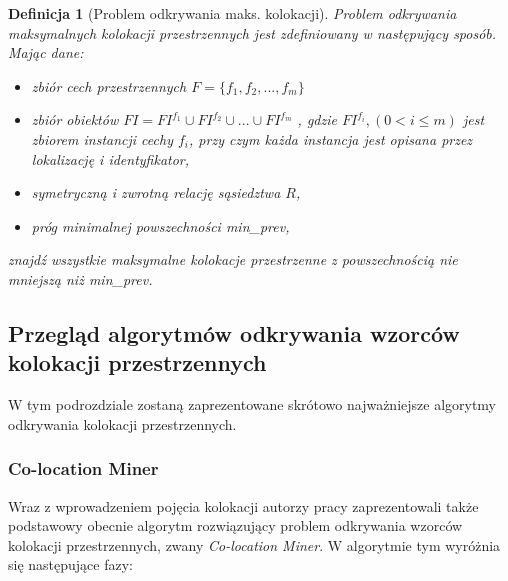 \documentclass[12pt]{article}
\newtheorem{defin}{Definicja}
\begin{document}

\begin{defin}[Problem odkrywania maks. kolokacji]
Problem odkrywania maksymalnych kolokacji przestrzennych jest zdefiniowany w następujący sposób.
Mając dane:
\begin{itemize}
\item zbiór cech przestrzennych $F = \{ f_{1}, f_{2}, ...,f_{m} \} $
\item zbiór obiektów $FI = FI^{f_{1}} \cup FI^{f_{2}} \cup ... \cup FI^{f_{m}}$  , gdzie $ FI^{f_{i}},(0 < i \le m) $ jest zbiorem instancji cechy $ f_{i}$, przy czym każda instancja jest opisana przez lokalizację i identyfikator,
\item symetryczną i zwrotną relację sąsiedztwa $R$,
\item próg minimalnej powszechności min\_prev,
\end{itemize}
znajdź wszystkie maksymalne kolokacje przestrzenne z powszechnością nie mniejszą niż min\_prev.
\end{defin}

\subsection{Przegląd algorytmów odkrywania wzorców kolokacji przestrzennych}

W tym podrozdziale zostaną zaprezentowane skrótowo najważniejsze algorytmy odkrywania kolokacji przestrzennych. 

\subsubsection{Co-location Miner}
\label{subsec:clm}

Wraz z wprowadzeniem pojęcia kolokacji autorzy pracy \cite{huang} zaprezentowali także podstawowy obecnie algorytm rozwiązujący problem odkrywania wzorców kolokacji przestrzennych, zwany \textit{Co-location Miner}. W algorytmie tym wyróżnia się następujące fazy:
\end{document}
